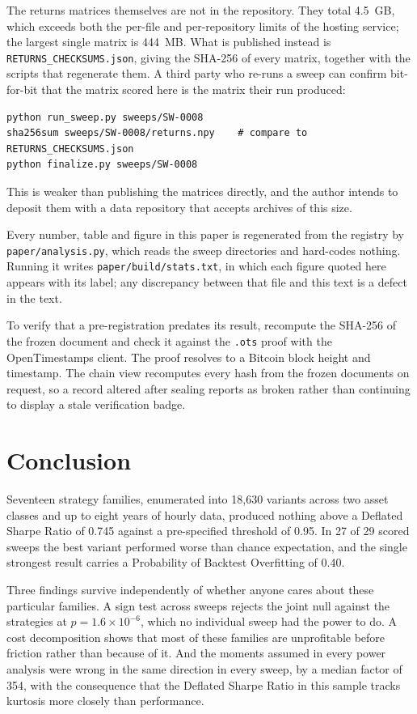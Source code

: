 \documentclass[11pt,a4paper]{article}
\begin{document}
The returns matrices themselves are not in the repository. They total 4.5~GB,
which exceeds both the per-file and per-repository limits of the hosting
service; the largest single matrix is 444~MB. What is published instead is
\texttt{RETURNS\_CHECKSUMS.json}, giving the SHA-256 of every matrix, together
with the scripts that regenerate them. A third party who re-runs a sweep can
confirm bit-for-bit that the matrix scored here is the matrix their run
produced:

\begin{verbatim}
python run_sweep.py sweeps/SW-0008
sha256sum sweeps/SW-0008/returns.npy    # compare to RETURNS_CHECKSUMS.json
python finalize.py sweeps/SW-0008
\end{verbatim}

This is weaker than publishing the matrices directly, and the author intends
to deposit them with a data repository that accepts archives of this size.

Every number, table and figure in this paper is regenerated from the registry
by \texttt{paper/analysis.py}, which reads the sweep directories and
hard-codes nothing. Running it writes \texttt{paper/build/stats.txt}, in which
each figure quoted here appears with its label; any discrepancy between that
file and this text is a defect in the text.

To verify that a pre-registration predates its result, recompute the SHA-256
of the frozen document and check it against the \texttt{.ots} proof with the
OpenTimestamps client. The proof resolves to a Bitcoin block height and
timestamp. The chain view recomputes every hash from the frozen documents on
request, so a record altered after sealing reports as broken rather than
continuing to display a stale verification badge.

\section{Conclusion}

Seventeen strategy families, enumerated into 18{,}630 variants across two
asset classes and up to eight years of hourly data, produced nothing above a
Deflated Sharpe Ratio of 0.745 against a pre-specified threshold of 0.95. In
27 of 29 scored sweeps the best variant performed worse than chance
expectation, and the single strongest result carries a Probability of
Backtest Overfitting of 0.40.

Three findings survive independently of whether anyone cares about these
particular families. A sign test across sweeps rejects the joint null against
the strategies at $p = 1.6\times10^{-6}$, which no individual sweep had the
power to do. A cost decomposition shows that most of these families are
unprofitable before friction rather than because of it. And the moments
assumed in every power analysis were wrong in the same direction in every
sweep, by a median factor of 354, with the consequence that the Deflated
Sharpe Ratio in this sample tracks kurtosis more closely than performance.
\end{document}
